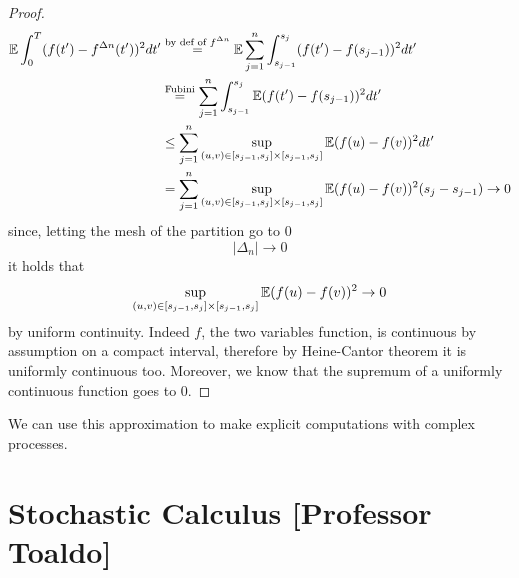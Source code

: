 \begin{ProofBox}
    \begin{proof}
    \begin{align*}
         \mathbb{E} \int_0^T (f(t')- f^{\Delta n}(t'))^2 dt' &\stackrel{\text{by def of }f^{\Delta n}}{=} \mathbb{E} \sum_{j=1}^n \int_{s_{j-1}}^{s_j}(f(t')- f(s_{j-1}))^2 dt' \\
         &\stackrel{\text{Fubini}}= \sum_{j = 1}^n \int_{s_{j-1}}^{s_j}\mathbb{E} (f(t')- f(s_{j-1}))^2 dt' \\
         &\leq \sum_{j=1}^n \sup_{(u,v) \in [s_{j-1},{s_j}] \times  [s_{j-1},{s_j}]} \mathbb{E} (f(u)- f(v))^2 dt'  \\
         &= \sum_{j=1}^n \sup_{(u,v)\in [s_{j-1}, s_j]\times [s_{j-1}, s_j]} \mathbb{E}(f(u)-f(v))^2 (s_{j}-s_{j-1}) \rightarrow 0
    \end{align*}
    since, letting the mesh of the partition go to $0$ 
    \begin{equation*}
        |\Delta_n| \rightarrow 0
    \end{equation*}
    it holds that 
    \begin{equation*}
        \sup_{(u,v)\in [s_{j-1}, s_j]\times [s_{j-1}, s_j]} \mathbb{E}(f(u)-f(v))^2 \rightarrow 0
    \end{equation*}
    by uniform continuity. Indeed $f$, the two variables function, is continuous by assumption on a compact interval, therefore by Heine-Cantor theorem it is uniformly continuous too. Moreover, we know that the supremum of a uniformly continuous function goes to $0$. 
\end{proof}
\end{ProofBox}

We can use this approximation to make explicit computations with complex processes. \\



\chapter{Stochastic Calculus [Professor Toaldo]}
